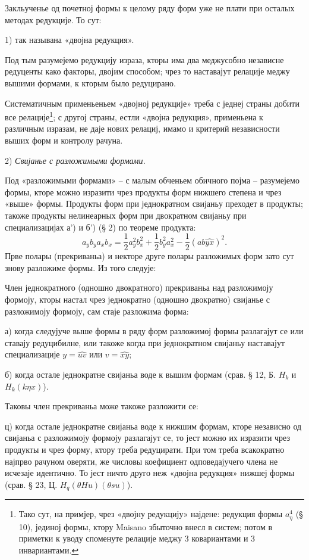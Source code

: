 ﻿\documentclass[11pt]{article}
\begin{document}
Закльученье од почетној формы к целому ряду форм уже не плати при осталых методах редукције. То сут:

1) так называна «двојна редукция».

Под тым разумејемо редукцију израза, кторы има два меджусобно независне редуценты како факторы, двојим способом; чрез то наставајут релације меджу вышими формами, к кторым было редуцирано.

Систематичным применьеньем «двојној редукције» треба с једнеј страны добити все релације\footnote{Тако сут, на примјер, чрез «двојну редукцију» најдене: редукция формы $a_\eta^4$ (§ 10), јединој формы, ктору Maisano збыточно внесл в систем; потом в приметки к уводу споменуте релације меджу 3 ковариантами и 3 инвариантами.}; с другој страны, естли «двојна редукция», применьена к различным изразам, не даје нових релациј, имамо и критерий независности выших форм и контролу рачуна.

2) {\itshape Свијанье с разложимыми формами.}

Под «разложимыми формами» -- с малым обченьем обичного појма -- разумејемо формы, кторе можно изразити чрез продукты форм нижшего степена и чрез «выше» формы. Продукты форм при једнократном свијаньу преходет в продукты; такоже продукты нелинеарных форм при двократном свијаньу при специализацијах а') и б') (§ 2) по теореме продукта:
\[
a_yb_y a_xb_x=\frac12a_y^2b_x^2+\frac12b_y^2a_x^2-\frac12(ab\widehat{yx})^2.
\]
Прве полары (прекриваньа) и некторе друге полары разложимых форм зато сут знову разложиме формы. Из того следује:

Член једнократного (одношно двократного) прекриваньа над разложимоју формоју, кторы настал чрез једнократно (одношно двократно) свијанье с разложимоју формоју, сам стаје разложима форма:

а) когда следујуче выше формы в ряду форм разложимој формы разлагајут се или ставају редуцибилне, или такоже когда при једнократном свијаньу наставајут специализације $y=\widehat{uv}$ или $v=\widehat{xy}$;

б) когда остале једнократне свијаньа воде к вышим формам (срав. § 12, Б. $H_k$ и $H_k(k\eta x)$).

Таковы член прекриваньа може такоже разложити се:

ц) когда остале једнократне свијаньа воде к нижшим формам, кторе независно од свијаньа с разложимоју формоју разлагајут се, то јест можно их изразити чрез продукты и чрез форму, ктору треба редуцирати. При том треба всакократно најпрво рачуном оверяти, же числовы коефициент одповедајучего члена не исчезаје идентично. То јест ничто друго неж «двојна редукция» нижшеј формы (срав. § 23, Ц. $H_q(\theta H u)(\theta s u)$).
\end{document}
